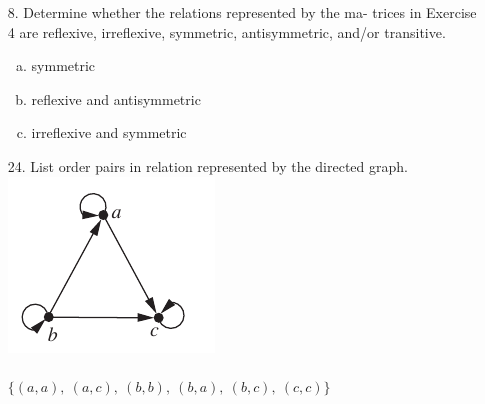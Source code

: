 \begin{itemize}
    \item[8.] Determine whether the relations represented by the ma-
          trices in Exercise 4 are reflexive, irreflexive, symmetric,
          antisymmetric, and/or transitive. \\
          \answer
          \begin{enumerate}[a.]
              \item symmetric
              \item reflexive and antisymmetric
              \item irreflexive and symmetric
          \end{enumerate}
    \item[24.] List order pairs in relation represented by the directed graph.\\
          \includegraphics[scale=0.5]{img/9_3_24_digraph.png} \\
          \answer \\
          $\{(a,a),\ (a,c),\ (b,b),\ (b,a),\ (b,c),\ (c,c)\}$
\end{itemize}

